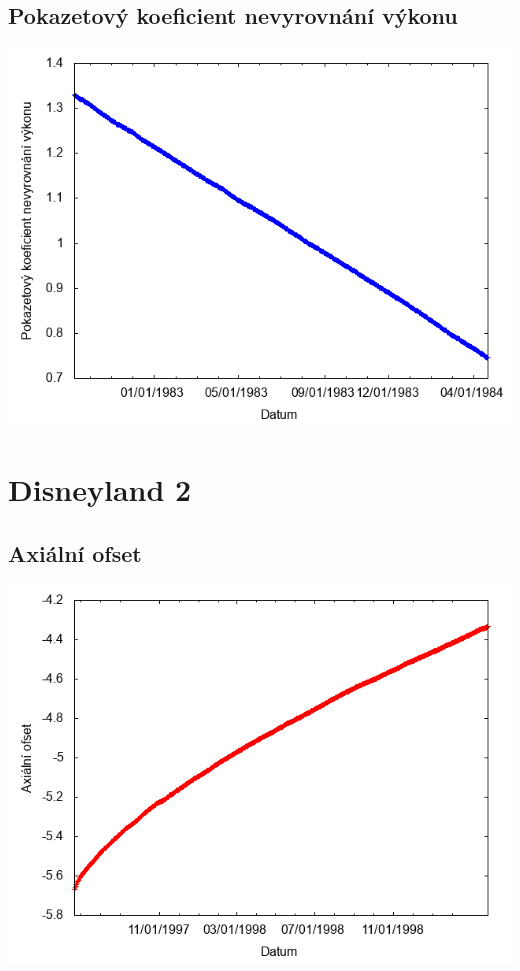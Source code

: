 \documentclass[a4paper,twoside,11pt]{article}
\begin{document}
\subsection*{Pokazetový koeficient nevyrovnání výkonu}
\begin{center}
\includegraphics[width=.8\textwidth]{graphs/Disneyland_01_fha.png}
\end{center}

\newpage
\section*{Disneyland 2}
\subsection*{Axiální ofset}
\begin{center}
\includegraphics[width=.8\textwidth]{graphs/Disneyland_02_ao.png}
\end{center}
\end{document}
